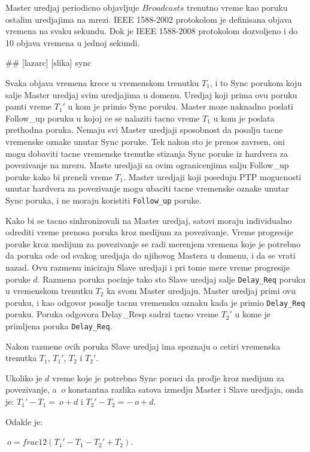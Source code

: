 \documentclass[a4paper,12pt, master]{etf}
\begin{document}
	Master uredjaj periodicno objavljuje \(Broadcasts\) trenutno vreme kao poruku ostalim 
	uredjajima na mrezi. IEEE 1588-2002 protokolom je definisana objava vremena na svaku 
	sekundu. Dok je IEEE 1588-2008 protokolom dozvoljeno i do 10 objava vremena u jednoj 
	sekundi.

	\#\# [lazarc] [slika] sync

	Svaka objava vremena krece u vremenskom trenutku $T_{1}$, i to Sync porukom koju salje 
	Master uredjaj svim uredjajima u domenu. Uredjaj koji prima ovu poruku pamti vreme $T_{1}'$ 
	u kom je primio Sync poruku. Master moze naknadno poslati Follow\_up poruku u kojoj ce se 
	nalaziti tacno vreme $T_{1}$ u kom je poslata prethodna poruka. Nemaju svi Master uredjaji 
	sposobnost da posalju tacne vremenske oznake unutar Sync poruke. Tek nakon sto je prenos 
	zavrsen, oni mogu dobaviti tacne vremenske trenutke stizanja Sync poruke iz hardvera za 
	povezivanje na mrezu. Maste uredjaji sa ovim ogranicenjima salju Follow\_up poruke kako bi 
	preneli vreme $T_{1}$. Master uredjaji koji poseduju PTP mogucnosti unutar hardvera za 
	povezivanje mogu ubaciti tacne vremenske oznake unutar Sync poruka, i ne moraju koristiti 
	\texttt{Follow\_up} poruke.

	Kako bi se tacno sinhronizovali na Master uredjaj, satovi moraju individualno odrediti 
	vreme prenosa poruka kroz medijum za povezivanje. Vreme progresije poruke kroz medijum za 
	povezivanje se radi merenjem vremena koje je potrebno da poruka ode od svakog uredjaja do 
	njihovog Mastera u domenu, i da se vrati nazad. Ovu razmenu iniciraju Slave uredjaji i 
	pri tome mere vreme progresije poruke $d$. Razmena poruka pocinje tako sto Slave uredjaj 
	salje \texttt{Delay\_Req} poruku u vremenskom trenutku $T_{2}$ ka svom Master uredjaju. 
	Master uredjaj primi ovu poruku, i kao odgovor posalje tacnu vremensku oznaku kada je primio 
	\texttt{Delay\_Req} poruku. Poruka odgovora Delay\_Resp sadrzi tacno vreme $T_{2}'$ u kome 
	je primljena poruka \texttt{Delay\_Req}.

	Nakon razmene ovih poruka Slave uredjaj ima spoznaju o cetiri vremenska trenutka $T_{1}$, 
	$T_{1}'$, $T_{2}$ i $T_{2}'$.

	Ukoliko je $d$ vreme koje je potrebno Sync poruci da prodje kroz medijum za povezivanje, 
	a $~o$ konstantna razlika satova izmedju Master i Slave uredjaja, onda je:
	$T_{1}' - T_{1} = ~o + d$ i $T_{2}' - T_{2} = -~o + d$.

	Odakle je:

	$~o=frac{1}{2}(T_{1}' - T_{1} - T_{2}' + T_{2})$.
\end{document}
